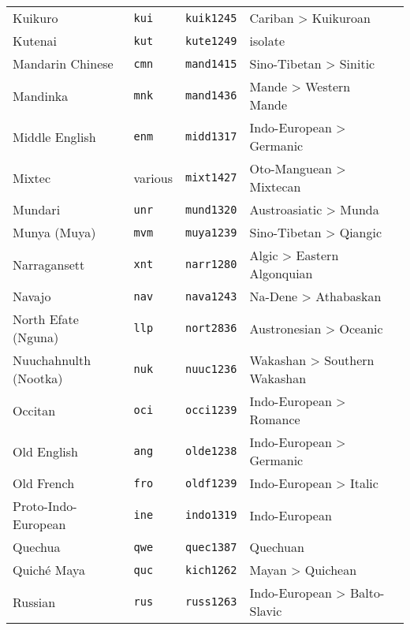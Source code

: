 \begin{longtable}[c]{ l l l l l }
  Kuikuro                          & \texttt{kui}       & \texttt{kuik1245}   & Cariban > Kuikuroan\\
  Kutenai                          & \texttt{kut}       & \texttt{kute1249}   & isolate\\
  Mandarin Chinese                 & \texttt{cmn}       & \texttt{mand1415}   & Sino-Tibetan > Sinitic\\
  Mandinka                         & \texttt{mnk}       & \texttt{mand1436}   & Mande > Western Mande\\
  Middle English                   & \texttt{enm}       & \texttt{midd1317}   & Indo-European > Germanic\\
  Mixtec                           & various            & \texttt{mixt1427}   & Oto-Manguean > Mixtecan\\
  Mundari                          & \texttt{unr}       & \texttt{mund1320}   & Austroasiatic > Munda\\
  Munya (Muya)                     & \texttt{mvm}       & \texttt{muya1239}   & Sino-Tibetan > Qiangic\\
  Narragansett                     & \texttt{xnt}       & \texttt{narr1280}   & Algic > Eastern Algonquian\\
  Navajo                           & \texttt{nav}       & \texttt{nava1243}   & Na-Dene > Athabaskan\\
  North Efate (Nguna)              & \texttt{llp}       & \texttt{nort2836}   & Austronesian > Oceanic\\
  Nuuchahnulth (Nootka)            & \texttt{nuk}       & \texttt{nuuc1236}   & Wakashan > Southern Wakashan\\
  Occitan                          & \texttt{oci}       & \texttt{occi1239}   & Indo-European > Romance\\
  Old English                      & \texttt{ang}       & \texttt{olde1238}   & Indo-European > Germanic\\
  Old French                       & \texttt{fro}       & \texttt{oldf1239}   & Indo-European > Italic\\
  Proto-Indo-European              & \texttt{ine}       & \texttt{indo1319}   & Indo-European\\
  Quechua                          & \texttt{qwe}       & \texttt{quec1387}   & Quechuan\\
  Quiché Maya                      & \texttt{quc}       & \texttt{kich1262}   & Mayan > Quichean\\
  Russian                          & \texttt{rus}       & \texttt{russ1263}   & Indo-European > Balto-Slavic\\

\end{longtable}
